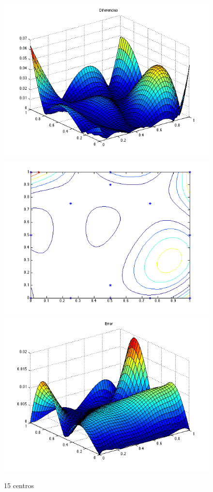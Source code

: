 \documentclass[11pt,a4paper]{article}
\begin{document}
\begin{figure}[H]
\centering

\includegraphics[scale=0.35]{diferencias15.png}
\includegraphics[scale=0.35]{centros15.png}
\includegraphics[scale=0.35]{error15.png}
\caption{15 centros}
\end{figure}
\end{document}
